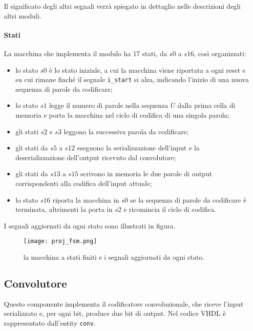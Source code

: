 \documentclass{article}
\begin{document}
			Il significato degli altri segnali verrà spiegato in dettaglio nelle descrizioni
			degli altri moduli.

			\paragraph{Stati}
			La macchina che implementa il modulo ha 17 stati, da $s0$ a $s16$, così organizzati:

			\begin{itemize}
				\item lo stato $s0$ è lo stato iniziale, a cui la macchina viene riportata a ogni
					reset e su cui rimane finché il segnale \verb|i_start| si alza, indicando
					l'inizio di una nuova sequenza di parole da codificare;
				\item lo stato $s1$ legge il numero di parole nella sequenza $U$ dalla prima cella
					di memoria e porta la macchina nel ciclo di codifica di una singola parola;
				\item gli stati $s2$ e $s3$ leggono la successiva parola da codificare;
				\item gli stati da $s5$ a $s12$ eseguono la serializzazione dell'input e la
					deserializzazione dell'output ricevuto dal convolutore;
				\item gli stati da $s13$ a $s15$ scrivono in memoria le due parole di output
					corrispondenti alla codifica dell'input attuale;
				\item lo stato $s16$ riporta la macchina in $s0$ se la sequenza di parole da
					codificare è terminata, altrimenti la porta in $s2$ e ricomincia il ciclo di
					codifica.
			\end{itemize}

			I segnali aggiornati da ogni stato sono illustrati in figura.

			\begin{figure}[H]
				\centering
				\texttt{[image: proj\_fsm.png]}
				\caption{la macchina a stati finiti e i segnali aggiornati da ogni stato.}
			\end{figure}

		\subsection{Convolutore}
			Questo componente implementa il codificatore convoluzionale, che riceve l'input
			serializzato e, per ogni bit, produce due bit di output. Nel codice VHDL è
			rappresentato dall'entity \verb|conv|.
\end{document}
